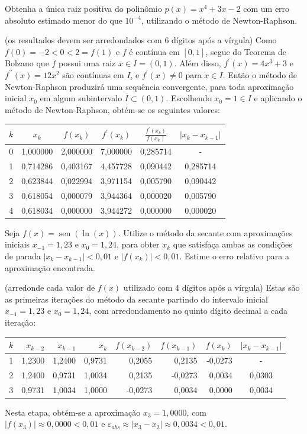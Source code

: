 \documentclass[12pt,a4paper]{article}
\newcommand*\sen{\operatorname{sen}}
\begin{document}
\begin{ExerciseList}
\Exercise[title={2,5}]
Obtenha a única raiz positiva do polinômio $p(x) = x^4+3x-2$ com um erro absoluto estimado menor do que $10^{-4}$, utilizando o método de Newton-Raphson.

(os resultados devem ser arredondados com 6 dígitos após a vírgula)
\Answer Como $f(0) = -2 < 0 < 2 = f(1)$ e $f$ é contínua em $[0,1]$, segue do Teorema de Bolzano que $f$ possui uma raiz $\overline{x} \in I = (0,1)$. Além disso, $f^\prime(x) = 4x^3+3$ e $f^{\prime\prime}(x) = 12x^2$ são contínuas em $I$, e $f^\prime(x) \neq 0$ para $x \in I$. Então o método de Newton-Raphson produzirá uma sequência convergente, para toda aproximação inicial $x_0$ em algum subintervalo $\overline{I} \subset (0,1)$. Escolhendo $x_0 = 1 \in I$ e aplicando o método de Newton-Raphson, obtém-se os seguintes valores:

\begin{center}
\begin{tabular}{|c|c|c|c|c|c|}
\hline 
$k$ & $x_k$ & $f(x_k)$ & $f^\prime(x_k)$ & $\frac{f^\prime(x_k)}{f(x_k)}$ & $|x_k - x_{k-1}|$ \\ 
\hline 
0 & 1,000000 & 2,000000 & 7,000000 & 0,285714 & -\\
\hline
1 & 0,714286 & 0,403167 & 4,457728 & 0,090442 & 0,285714 \\
\hline
2 & 0,623844 & 0,022994 & 3,971154 & 0,005790 & 0,090442 \\
\hline
3 & 0,618054 & 0,000079 & 3,944364 & 0,000020 & 0,005790 \\ 
\hline
4 & 0,618034 & 0,000000 & 3,944272 & 0,000000 & 0,000020 \\ 
\hline
\end{tabular} 
\end{center}

\Exercise[title={2,5}] Seja $f(x) = \sen(\ln(x))$. Utilize o método da secante com aproximações iniciais $x_{-1}=1,23$ e $x_0 = 1,24$, para obter $x_k$ que satisfaça ambas as condições de parada $|x_k-x_{k-1}| < 0,01$ e $|f(x_k)| < 0,01$. Estime o erro relativo para a aproximação encontrada.

(arredonde cada valor de $f(x)$ utilizado com 4 dígitos após a vírgula)
\Answer Estas são as primeiras iterações do método da secante partindo do intervalo inicial $x_{-1} = 1,23$ e $x_0 = 1,24$, com arredondamento no quinto dígito decimal a cada iteração:
\begin{center}
\begin{tabular}{|r|r|r|r|r|r|r|c|}
\hline
$k$ & $x_{k-2}$ & $x_{k-1}$ & $x_k$ & $f(x_{k-2})$ & $f(x_{k-1})$ & $f(x_k)$ & $|x_k-x_{k-1}|$ \\
\hline
1 & 1,2300 & 1,2400 & 0,9731 &  0,2055 &  0,2135 & -0,0273 & - \\\hline
2 & 1,2400 & 0,9731 & 1,0034 &  0,2135 & -0,0273 &  0,0034 & 0,0303 \\\hline
3 & 0,9731 & 1,0034 & 1,0000 & -0,0273 &  0,0034 &  0,0000 & 0,0034 \\\hline
\end{tabular}
\end{center}
\medskip
Nesta etapa, obtém-se a aproximação $x_3 = 1,0000$, com $|f(x_3)| \approx 0,0000 < 0,01$ e $\varepsilon_{abs} \approx |x_3-x_2| \approx 0,0034 < 0,01$.



\end{ExerciseList}
\end{document}
